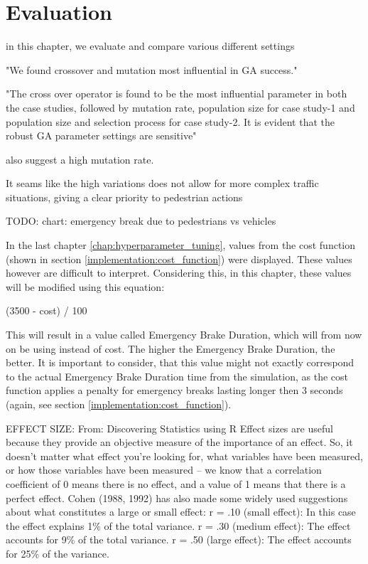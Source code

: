 \chapter{Evaluation}
\label{chap:evaluation}
in this chapter, we evaluate and compare various different settings

"We found crossover and mutation most influential in GA success."\cite{mills_determining_2015}

"The cross over operator is found to be the most influential parameter in both the case studies, followed by mutation rate, population size for case study-1 and population size and selection process for case study-2. It is evident that the robust GA parameter settings are sensitive"\cite{majumdar_genetic_2015}

\cite{boyabatli_parameter_2004} also suggest a high mutation rate.



It seams like the high variations does not allow for more complex traffic situations, giving a clear priority to pedestrian actions

TODO: chart: emergency break due to pedestrians vs vehicles


In the last chapter \ref{chap:hyperparameter_tuning}, values from the cost function (shown in section \ref{implementation:cost_function}) were displayed. These values however are difficult to interpret. Considering this, in this chapter, these values will be modified using this equation:

(3500 - cost) / 100

This will result in a value called Emergency Brake Duration, which will from now on be using instead of cost. The higher the Emergency Brake Duration, the better. It is important to consider, that this value might not exactly correspond to the actual Emergency Brake Duration time from the simulation, as the cost function applies a penalty for emergency breaks lasting longer then 3 seconds (again, see section \ref{implementation:cost_function}).






EFFECT SIZE:
From: Discovering Statistics using R
Effect sizes are useful because they provide an objective measure of the importance of an effect. So, it doesn’t matter what effect you’re looking for, what variables have been measured, or how those variables have been measured – we know that a correlation coefficient of 0 means there is no effect, and a value of 1 means that there is a perfect effect.
Cohen (1988, 1992) has also made some widely used suggestions about what constitutes a large or small effect: 
r = .10 (small effect): In this case the effect explains 1\% of the total variance. 
r = .30 (medium effect): The effect accounts for 9\% of the total variance. 
r = .50 (large effect): The effect accounts for 25\% of the variance.

